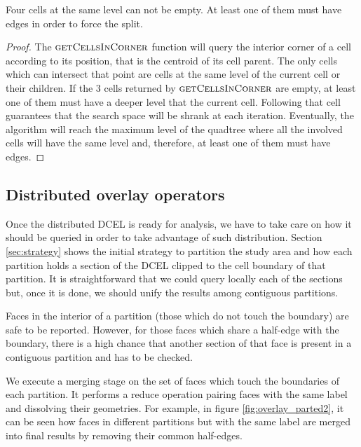 \begin{lemma}
Four cells at the same level can not be empty.  At least one of them must have edges in order to force the split.
\end{lemma}

\begin{proof}
The $\textsc{getCellsInCorner}$ function will query the interior corner of a cell according to its position, that is the centroid of its cell parent.  The only cells which can intersect that point are cells at the same level of the current cell or their children.  If the 3 cells returned by $\textsc{getCellsInCorner}$ are empty, at least one of them must have a deeper level that the current cell.  Following that cell guarantees that the search space will be shrank at each iteration.  Eventually, the algorithm will reach the maximum level of the quadtree where all the involved cells will have the same level and, therefore, at least one of them must have edges.
\end{proof}

\subsection{Distributed overlay operators} \label{sec:overlay}
Once the distributed DCEL is ready for analysis, we have to take care on how it should be queried in order to take advantage of such distribution.  Section \ref{sec:strategy} shows the initial strategy to partition the study area and how each partition holds a section of the DCEL clipped to the cell boundary of that partition.  It is straightforward that we could query locally each of the sections but, once it is done, we should unify the results among contiguous partitions.

Faces in the interior of a partition (those which do not touch the boundary) are safe to be reported.  However, for those faces which share a half-edge with the boundary, there is a high chance that another section of that face is present in a contiguous partition and has to be checked.  

We execute a merging stage on the set of faces which touch the boundaries of each partition.  It performs a reduce operation pairing faces with the same label and dissolving their geometries.  For example, in figure \ref{fig:overlay_parted2}, it can be seen how faces in different partitions but with the same label are merged into final results by removing their common half-edges. 
